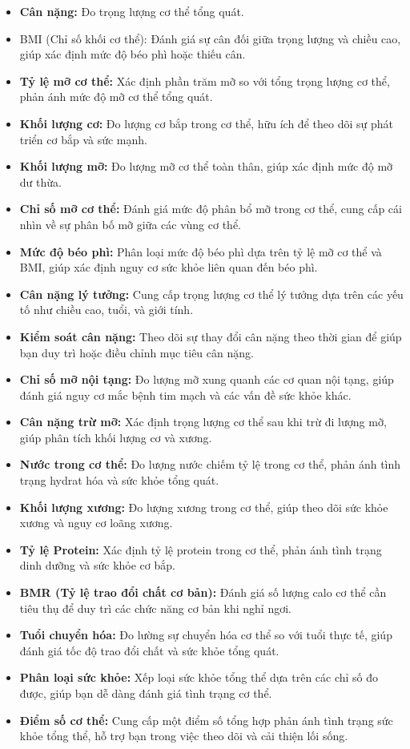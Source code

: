 \begin{itemize}
    \item \textbf{Cân nặng:} Đo trọng lượng cơ thể tổng quát.
    \item BMI (Chỉ số khối cơ thể): Đánh giá sự cân đối giữa trọng lượng và chiều cao, giúp xác định mức độ béo phì hoặc thiếu cân.
    \item \textbf{Tỷ lệ mỡ cơ thể:} Xác định phần trăm mỡ so với tổng trọng lượng cơ thể, phản ánh mức độ mỡ cơ thể tổng quát.
    \item \textbf{Khối lượng cơ:} Đo lượng cơ bắp trong cơ thể, hữu ích để theo dõi sự phát triển cơ bắp và sức mạnh.
    \item \textbf{Khối lượng mỡ:} Đo lượng mỡ cơ thể toàn thân, giúp xác định mức độ mỡ dư thừa.
    \item \textbf{Chỉ số mỡ cơ thể:} Đánh giá mức độ phân bổ mỡ trong cơ thể, cung cấp cái nhìn về sự phân bố mỡ giữa các vùng cơ thể.
    \item \textbf{Mức độ béo phì:} Phân loại mức độ béo phì dựa trên tỷ lệ mỡ cơ thể và BMI, giúp xác định nguy cơ sức khỏe liên quan đến béo phì.
    \item \textbf{Cân nặng lý tưởng:} Cung cấp trọng lượng cơ thể lý tưởng dựa trên các yếu tố như chiều cao, tuổi, và giới tính.
    \item \textbf{Kiểm soát cân nặng:} Theo dõi sự thay đổi cân nặng theo thời gian để giúp bạn duy trì hoặc điều chỉnh mục tiêu cân nặng.
    \item \textbf{Chỉ số mỡ nội tạng:} Đo lượng mỡ xung quanh các cơ quan nội tạng, giúp đánh giá nguy cơ mắc bệnh tim mạch và các vấn đề sức khỏe khác.
    \item \textbf{Cân nặng trừ mỡ:} Xác định trọng lượng cơ thể sau khi trừ đi lượng mỡ, giúp phân tích khối lượng cơ và xương.
    \item \textbf{Nước trong cơ thể:} Đo lượng nước chiếm tỷ lệ trong cơ thể, phản ánh tình trạng hydrat hóa và sức khỏe tổng quát.
    \item \textbf{Khối lượng xương:} Đo lượng xương trong cơ thể, giúp theo dõi sức khỏe xương và nguy cơ loãng xương.
    \item \textbf{Tỷ lệ Protein:} Xác định tỷ lệ protein trong cơ thể, phản ánh tình trạng dinh dưỡng và sức khỏe cơ bắp.
    \item \textbf{BMR (Tỷ lệ trao đổi chất cơ bản):} Đánh giá số lượng calo cơ thể cần tiêu thụ để duy trì các chức năng cơ bản khi nghỉ ngơi.
    \item \textbf{Tuổi chuyển hóa:} Đo lường sự chuyển hóa cơ thể so với tuổi thực tế, giúp đánh giá tốc độ trao đổi chất và sức khỏe tổng quát.
    \item \textbf{Phân loại sức khỏe:} Xếp loại sức khỏe tổng thể dựa trên các chỉ số đo được, giúp bạn dễ dàng đánh giá tình trạng cơ thể.
    \item \textbf{Điểm số cơ thể:} Cung cấp một điểm số tổng hợp phản ánh tình trạng sức khỏe tổng thể, hỗ trợ bạn trong việc theo dõi và cải thiện lối sống.
\end{itemize}

